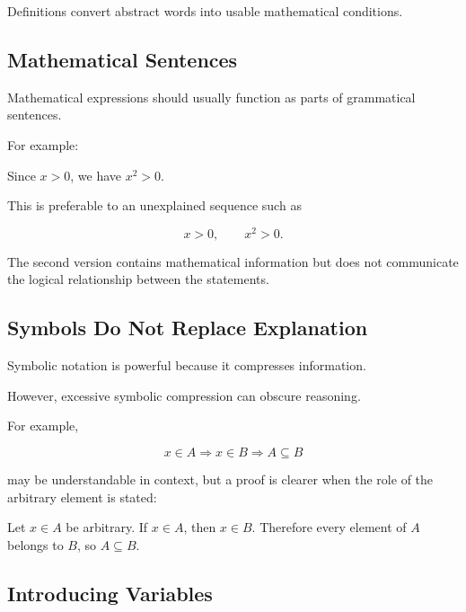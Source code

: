 Definitions convert abstract words into usable mathematical conditions.

\subsection{Mathematical Sentences}
\label{subsec:mathematical-sentences}

Mathematical expressions should usually function as parts of grammatical
sentences.

For example:

\begin{center}
Since \(x>0\), we have \(x^2>0\).
\end{center}

This is preferable to an unexplained sequence such as

\[ x>0,\qquad x^2>0. \]

The second version contains mathematical information but does not communicate
the logical relationship between the statements.

\subsection{Symbols Do Not Replace Explanation}
\label{subsec:symbols-not-explanation}

Symbolic notation is powerful because it compresses information.

However, excessive symbolic compression can obscure reasoning.

For example,

\[ x\in A\Rightarrow x\in B\Rightarrow A\subseteq B \]

may be understandable in context, but a proof is clearer when the role of the
arbitrary element is stated:

\begin{center}
Let \(x\in A\) be arbitrary. If \(x\in A\), then \(x\in B\). Therefore every
element of \(A\) belongs to \(B\), so \(A\subseteq B\).
\end{center}

\subsection{Introducing Variables}
\label{subsec:introducing-variables}

